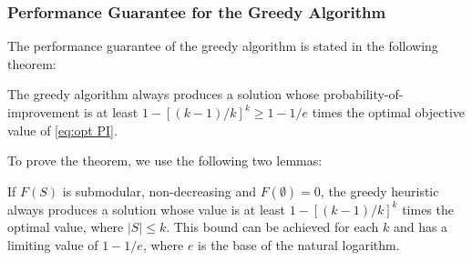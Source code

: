\subsubsection{Performance Guarantee for the Greedy Algorithm} \label{sec:lower bound}
The performance guarantee of the greedy algorithm is stated in the following theorem:
\begin{theorem} \label{thm:greedy}
  The greedy algorithm always produces a solution whose probability-of-improvement is at 
  least $1-[(k-1)/k]^k \geq 1 - 1 / e$ times the optimal objective
  value of \eqref{eq:opt PI}.
\end{theorem}
To prove the theorem, we use the following two lemmas:
\begin{lemma} \citep{nemhauser1978analysis} \label{lemma:1}
  If $F(S)$ is submodular, non-decreasing and $F(\emptyset)=0$, the greedy heuristic always 
  produces a solution whose value is at least $1-[(k-1)/k]^k$ times the optimal value, where 
  $|S| \leq k$. This bound can be achieved for each $k$ and has a limiting value of $1-1/e$, 
  where $e$ is the base of the natural logarithm.
\end{lemma}

